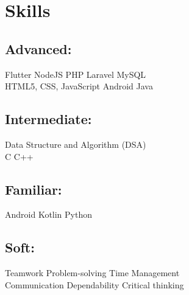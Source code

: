 \documentclass[]{deedy-resume-openfont}
\begin{document}
%
%
\lastupdated

%
%

%
%

\begin{minipage}[t]{0.4\textwidth} 


\section{Skills}
\subsection{Advanced:}
Flutter \textbullet{} NodeJS \textbullet{} PHP \textbullet{} Laravel \textbullet{} MySQL
\\HTML5, CSS, JavaScript \textbullet{} Android Java
\sectionsep
\subsection{Intermediate:}
Data Structure and Algorithm (DSA)\\
C \textbullet{} C++
\sectionsep
\subsection{Familiar:}
Android Kotlin \textbullet{} Python
\sectionsep
\subsection{Soft:}
Teamwork \textbullet{} Problem-solving \textbullet{} Time Management\\ Communication \textbullet{} Dependability \textbullet{} Critical thinking


\end{minipage}
\end{document}
